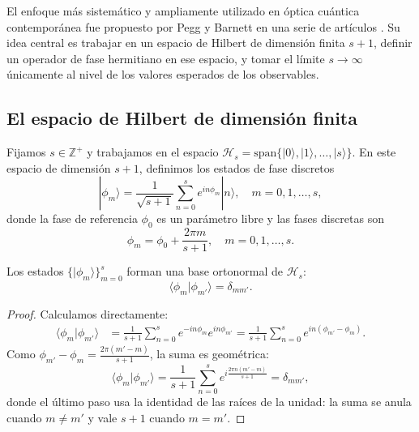         El enfoque más sistemático y ampliamente utilizado en óptica cuántica contemporánea fue propuesto por Pegg y Barnett en una serie de artículos \cite{Pegg1988,Pegg1989,Barnett1986,Barnett1989}. Su idea central es trabajar en un espacio de Hilbert de dimensión finita $s+1$, definir un operador de fase hermitiano en ese espacio, y tomar el límite $s \to \infty$ únicamente al nivel de los valores esperados de los observables.
 
        \subsection{El espacio de Hilbert de dimensión finita}
        
            Fijamos $s \in \mathbb{Z}^+$ y trabajamos en el espacio $\mathcal{H}_s = \text{span}\{|0\rangle, |1\rangle, \ldots, |s\rangle\}$. En este espacio de dimensión $s+1$, definimos los estados de fase discretos
            \begin{equation}
                |\phi_m\rangle = \frac{1}{\sqrt{s+1}}\sum_{n=0}^{s} e^{in\phi_m}|n\rangle, \quad m = 0, 1, \ldots, s,
                \label{eq:PB_estados_fase}
            \end{equation}
            donde la fase de referencia $\phi_0$ es un parámetro libre y las fases discretas son
            \begin{equation}
                \phi_m = \phi_0 + \frac{2\pi m}{s+1}, \quad m = 0, 1, \ldots, s.
                \label{eq:PB_fases_discretas}
            \end{equation}
            
            \begin{proposition}
            Los estados $\{|\phi_m\rangle\}_{m=0}^{s}$ forman una base ortonormal de $\mathcal{H}_s$:
            \begin{equation}
                \langle\phi_m|\phi_{m'}\rangle = \delta_{mm'}.
                \label{eq:PB_ortonormalidad}
            \end{equation}
            \end{proposition}
            \begin{proof}
            Calculamos directamente:
            \begin{align}
                \langle\phi_m|\phi_{m'}\rangle &= \frac{1}{s+1}\sum_{n=0}^{s} e^{-in\phi_m} e^{in\phi_{m'}} = \frac{1}{s+1}\sum_{n=0}^{s} e^{in(\phi_{m'}-\phi_m)}.
            \end{align}
            Como $\phi_{m'} - \phi_m = \frac{2\pi(m'-m)}{s+1}$, la suma es geométrica:
            \begin{equation}
                \langle\phi_m|\phi_{m'}\rangle = \frac{1}{s+1}\sum_{n=0}^{s} e^{i \frac{2\pi n(m'-m)}{s+1}} = \delta_{mm'},
            \end{equation}
            donde el último paso usa la identidad de las raíces de la unidad: la suma se anula cuando $m \neq m'$ y vale $s+1$ cuando $m = m'$.
            \end{proof}
 
